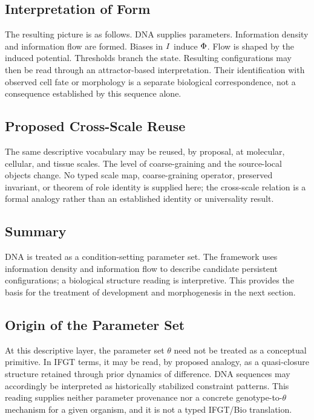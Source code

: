 \subsection{Interpretation of Form}

The resulting picture is as follows. DNA supplies parameters. Information density and information flow are formed. Biases in \(I\) induce \(\Phi\). Flow is shaped by the induced potential. Thresholds branch the state. Resulting configurations may then be read through an attractor-based interpretation. Their identification with observed cell fate or morphology is a separate biological correspondence, not a consequence established by this sequence alone.

\subsection{Proposed Cross-Scale Reuse}

The same descriptive vocabulary may be reused, by proposal, at molecular, cellular, and tissue scales. The level of coarse-graining and the source-local objects change. No typed scale map, coarse-graining operator, preserved invariant, or theorem of role identity is supplied here; the cross-scale relation is a formal analogy rather than an established identity or universality result.

\subsection{Summary}

DNA is treated as a condition-setting parameter set. The framework uses information density and information flow to describe candidate persistent configurations; a biological structure reading is interpretive. This provides the basis for the treatment of development and morphogenesis in the next section.

\subsection{Origin of the Parameter Set}

At this descriptive layer, the parameter set \(\theta\) need not be treated as a conceptual primitive. In IFGT terms, it may be read, by proposed analogy, as a quasi-closure structure retained through prior dynamics of difference. DNA sequences may accordingly be interpreted as historically stabilized constraint patterns. This reading supplies neither parameter provenance nor a concrete genotype-to-\(\theta\) mechanism for a given organism, and it is not a typed IFGT/Bio translation.
